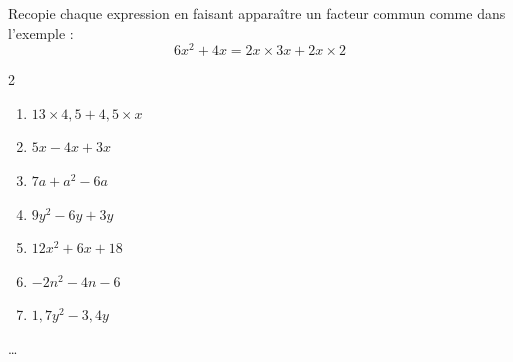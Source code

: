 \begin{exercice*}
    Recopie chaque expression en faisant apparaître un facteur commun comme dans l'exemple :
    \[6x^{2} + 4x = 2x \times 3x + 2x \times 2\]
    \begin{multicols}{2}
        \begin{enumerate}
            \item $13 \times 4,5 + 4,5 \times x$
            \item $5x - 4x + 3x$
            \item $7a + a^{2} - 6a$
            \item $9y^{2} - 6y + 3y$
            \item $12x^{2} + 6x + 18$
            \item $-2n^{2} - 4n - 6$
            \item $1,7y^{2} - 3,4y$
        \end{enumerate}
    \end{multicols}
\end{exercice*}
\begin{corrige}
    \dots
\end{corrige}

